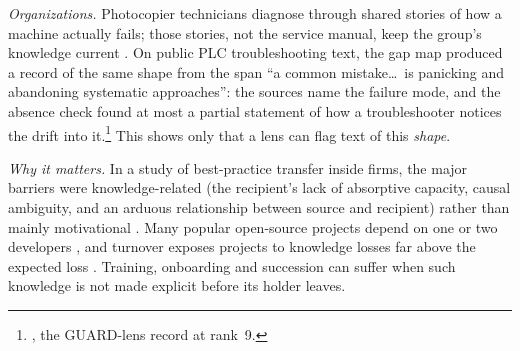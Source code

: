 \evlit{} \emph{Organizations.} Photocopier technicians diagnose through shared stories of how a
machine actually fails; those stories, not the service manual, keep the group's knowledge current
\parencite{orr1996talking,brown1991organizational}. \evobs{} On public PLC troubleshooting text, the
gap map produced a record of the same shape from the span \enquote{a common mistake\dots\ is
panicking and abandoning systematic approaches}: the sources name the failure mode, and the absence
check found at most a partial statement of how a troubleshooter notices the drift into
it.\footnote{, the GUARD-lens record at rank~9.} This shows only
that a lens can flag text of this \emph{shape}.

\evlit{} \emph{Why it matters.} In a study of best-practice transfer inside firms, the major barriers
were knowledge-related (the recipient's lack of absorptive capacity, causal ambiguity, and an arduous
relationship between source and recipient) rather than mainly motivational
\parencite{szulanski1996exploring}. Many popular open-source projects depend on one or two developers
\parencite{avelino2016novel}, and turnover exposes projects to knowledge losses far above the expected
loss \parencite{rigby2016quantifying}. \evint{} Training, onboarding and succession can suffer when such
knowledge is not made explicit before its holder leaves.
